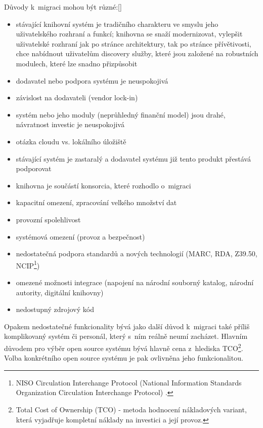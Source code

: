 \documentclass[
	11pt, oneside, printed, draft, 
	table,   %
	lof,     %
	lot     %
]{fithesis3}
\newcommand{\citepages}[2]{[\cite[#1]{#2}]}
\newcommand{\mezera}{\bigskip}
\begin{document}
{Důvody k~migraci mohou být různé:\citepages{152}{bilal_2014} %
\mezera
\begin{itemize}
\item stávající knihovní systém je tradičního charakteru ve smyslu jeho uživatelského rozhraní a funkcí; knihovna se snaží modernizovat, vylepšit uživatelské rozhraní jak po stránce architektury, tak po stránce přívětivosti, chce nabídnout uživatelům discovery služby, které jsou založené na robustních modulech, které lze snadno přizpůsobit
\item dodavatel nebo podpora systému je neuspokojivá
\item závislost na dodavateli (vendor lock-in)
\item systém nebo jeho moduly (neprůhledný finanční model) jsou drahé, návratnost investic je neuspokojivá
\item otázka cloudu vs. lokálního úložiště
\item stávající systém je zastaralý a dodavatel systému již tento produkt přestává podporovat
\item knihovna je součástí konsorcia, které rozhodlo o~migraci
\item kapacitní omezení, zpracování velkého množství dat
\item provozní spolehlivost
\item systémová omezení (provoz a bezpečnost)
\item nedostatečná podpora standardů a nových technologií (MARC, RDA, Z39.50, NCIP\footnote{NISO Circulation Interchange Protocol (National Information Standards Organization Circulation Interchange Protocol)
.})
\item omezené možnosti integrace (napojení na národní souborný katalog, národní autority, digitální knihovny)
\item nedostupný zdrojový kód
\end{itemize}

Opakem nedostatečné funkcionality bývá jako další důvod k~migraci také příliš komplikovaný systém či personál, který s~ním reálně neumí zacházet. Hlavním důvodem pro výběr open source systému bývá hlavně cena z~hlediska TCO\footnote{Total Cost of Ownership (TCO) - metoda hodnocení nákladových variant, která vyjadřuje kompletní náklady na investici a její provoz.}. Volba konkrétního open source systému je pak ovlivněna jeho funkcionalitou.

}
\end{document}
